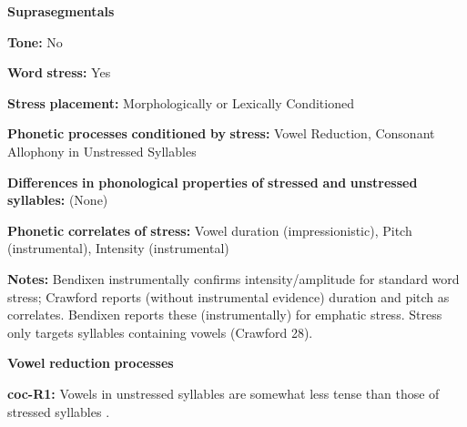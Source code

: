 \begin{styleBody}
\textbf{Suprasegmentals}
\end{styleBody}

\begin{styleBody}
\textbf{Tone:} No
\end{styleBody}

\begin{styleBody}
\textbf{Word} \textbf{stress:} Yes
\end{styleBody}

\begin{styleBody}
\textbf{Stress} \textbf{placement:} Morphologically or Lexically Conditioned
\end{styleBody}

\begin{styleBody}
\textbf{Phonetic} \textbf{processes} \textbf{conditioned} \textbf{by} \textbf{stress:} Vowel Reduction, Consonant Allophony in Unstressed Syllables
\end{styleBody}

\begin{styleBody}
\textbf{Differences} \textbf{in} \textbf{phonological} \textbf{properties} \textbf{of} \textbf{stressed} \textbf{and} \textbf{unstressed} \textbf{syllables:} (None)
\end{styleBody}

\begin{styleBody}
\textbf{Phonetic} \textbf{correlates} \textbf{of} \textbf{stress:} Vowel duration (impressionistic), Pitch (instrumental), Intensity (instrumental)
\end{styleBody}

\begin{styleBody}
\textbf{Notes:} Bendixen instrumentally confirms intensity/amplitude for standard word stress; Crawford reports (without instrumental evidence) duration and pitch as correlates. Bendixen reports these (instrumentally) for emphatic stress. Stress only targets syllables containing vowels (Crawford 28).
\end{styleBody}

\begin{styleBody}
\textbf{Vowel} \textbf{reduction} \textbf{processes}
\end{styleBody}

\begin{styleBody}
\textbf{coc-R1:} Vowels in unstressed syllables are somewhat less tense than those of stressed syllables \citep[22]{Crawford1966}.
\end{styleBody}

